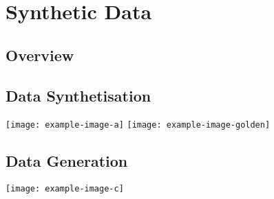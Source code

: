 \chapter{Synthetic Data}
\section{Overview}
\lipsum[5-6]
\section{Data Synthetisation}
\lipsum[6-8]
\noindent\texttt{[image: example-image-a]}\qquad
\texttt{[image: example-image-golden]}\qquad
\section{Data Generation}
\lipsum[8-9]
\noindent\texttt{[image: example-image-c]} 